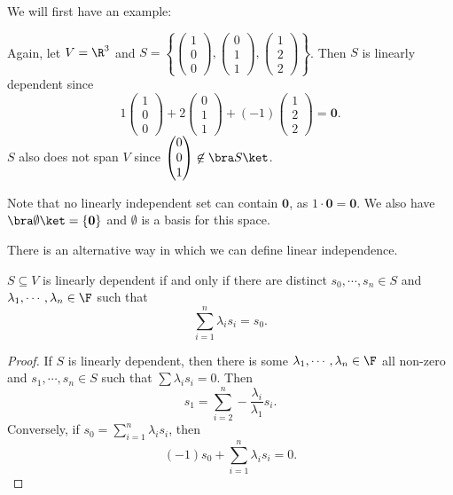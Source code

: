 \documentclass[a4paper]{article}
\begin{document}
We will first have an example:
\begin{eg}
  Again, let $V = \R^3$ and $S = \left\{\begin{pmatrix}1\\0\\0\end{pmatrix}, \begin{pmatrix}0\\1\\1\end{pmatrix}, \begin{pmatrix}1\\2\\2\end{pmatrix}\right\}$. Then $S$ is linearly dependent since
  \[
    1\begin{pmatrix}1\\0\\0\end{pmatrix} + 2\begin{pmatrix}0\\1\\1\end{pmatrix} + (-1) \begin{pmatrix}1\\2\\2\end{pmatrix} = \mathbf{0}.
  \]
  $S$ also does not span $V$ since $\begin{pmatrix}0\\0\\1\end{pmatrix}\not \in \bra S\ket$.
\end{eg}

Note that no linearly independent set can contain $\mathbf{0}$, as $1\cdot \mathbf{0} = \mathbf{0}$. We also have $\bra \emptyset\ket = \{\mathbf{0}\}$ and $\emptyset$ is a basis for this space.

There is an alternative way in which we can define linear independence.
\begin{lemma}
  $S\subseteq V$ is linearly dependent if and only if there are distinct $s_0, \cdots, s_n \in S$ and $\lambda_1, \cdots, \lambda_n\in \F$ such that
  \[
    \sum_{i = 1}^n \lambda_i s_i = s_0.
  \]
\end{lemma}

\begin{proof}
  If $S$ is linearly dependent, then there is some $\lambda_1, \cdots, \lambda_n \in \F$ all non-zero and $s_1,\cdots, s_n \in S$ such that $\sum \lambda_i s_i = 0$. Then
  \[
    s_1 = \sum_{i = 2}^n -\frac{\lambda_i}{\lambda_1} s_i.
  \]
  Conversely, if $s_0 = \sum_{i = 1}^n \lambda_i s_i$, then
  \[
    (-1)s_0 + \sum_{i = 1}^n \lambda_i s_i = 0.
  \]
\end{proof}
\end{document}
